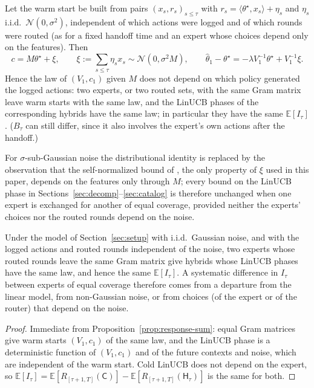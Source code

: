 \documentclass[anon]{alt2027} %
\newcommand{\E}{\mathbb{E}}
\newcommand{\Cold}{\mathsf{C}}
\newcommand{\Hyb}{\mathsf{H}}
\begin{document}
\begin{proposition}
\label{prop:response-sum}
Let the warm start be built from pairs $(x_s,r_s)_{s\le\tau}$ with
$r_s=\langle\theta^\star,x_s\rangle+\eta_s$ and $\eta_s$ i.i.d.\
$\mathcal N(0,\sigma^2)$, independent of which actions were logged and of
which rounds were routed (as for a fixed handoff time and an expert whose
choices depend only on the features). Then
\[
c=M\theta^\star+\xi,\qquad \xi:=\sum_{s\le\tau}\eta_sx_s\sim\mathcal N(0,\sigma^2M),
\qquad
\widehat\theta_1-\theta^\star=-\lambda V_1^{-1}\theta^\star+V_1^{-1}\xi .
\]
Hence the law of $(V_1,c_1)$ given $M$ does not depend on which policy
generated the logged actions: two experts, or two routed sets, with the same
Gram matrix leave warm starts with the same law, and the LinUCB phases of the
corresponding hybrids have the same law; in particular they have the same
$\E[I_\tau]$. ($B_\tau$ can still differ, since it also involves the expert's
own actions after the handoff.)
\end{proposition}

For $\sigma$-sub-Gaussian noise the distributional identity is replaced by the
observation that the self-normalized bound of \citet{abbasi2011improved}, the
only property of $\xi$ used in this paper, depends on the features only
through $M$; every bound on the LinUCB phase in
Sections~\ref{sec:decomp}--\ref{sec:catalog} is therefore unchanged when one
expert is exchanged for another of equal coverage, provided neither the
experts' choices nor the routed rounds depend on the noise.

\begin{corollary}
\label{cor:coverage-complete}
Under the model of Section~\ref{sec:setup} with i.i.d.\ Gaussian noise, and
with the logged actions and routed rounds independent of the noise, two
experts whose routed rounds leave the same Gram matrix give hybrids whose
LinUCB phases have the same law, and hence the same $\E[I_\tau]$. A systematic
difference in $I_\tau$ between experts of equal coverage therefore comes from
a departure from the linear model, from non-Gaussian noise, or from choices
(of the expert or of the router) that depend on the noise.
\end{corollary}

\begin{proof}
Immediate from Proposition~\ref{prop:response-sum}: equal Gram matrices give
warm starts $(V_1,c_1)$ of the same law, and the LinUCB phase is a
deterministic function of $(V_1,c_1)$ and of the future contexts and noise,
which are independent of the warm start. Cold LinUCB does not depend on the
expert, so $\E[I_\tau]=\E[R_{[\tau+1,T]}(\Cold)]-\E[R_{[\tau+1,T]}(\Hyb_\tau)]$
is the same for both.
\end{proof}
\end{document}
